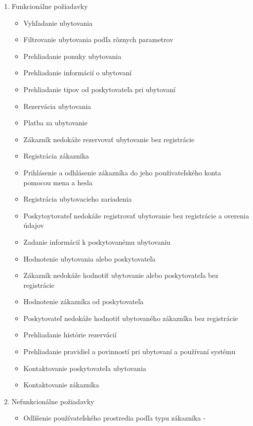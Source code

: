 \begin{enumerate}[label=\Alph*.]
    \item Funkcionálne požiadavky
    \begin{itemize}
        \item Vyhľadanie ubytovania
        \item Filtrovanie ubytovania podľa rôznych parametrov
        \item Prehliadanie ponuky ubytovania
        \item Prehliadanie informácií o ubytovaní
        \item Prehliadanie tipov od poskytovateľa pri ubytovaní
        \item Rezervácia ubytovania
        \item Platba za ubytovanie
        \item Zákazník nedokáže rezervovať ubytovanie bez registrácie
        \item Registrácia zákazníka
        \item Prihlásenie a odhlásenie zákazníka do jeho používateľského konta 
        pomocou mena a hesla
        \item Registrácia ubytovacieho zariadenia
        \item Poskytoytovateľ nedokáže registrovať ubytovanie bez 
        registrácie a overenia údajov
        \item Zadanie informácií k poskytovanému ubytovaniu
        \item Hodnotenie ubytovania alebo poskytovateľa
        \item Zákazník nedokáže hodnotiť ubytovanie alebo poskytovateľa 
        bez registrácie
        \item Hodnotenie zákazníka od poskytovateľa
        \item Poskytovateľ nedokáže hodnotiť ubytovaného zákazníka bez 
        registrácie
        \item Prehliadanie histórie rezervácií
        \item Prehliadanie pravidiel a povinností pri ubytovaní a 
        používaní systému
        \item Kontaktovanie poskytovateľa ubytovania
        \item Kontaktovanie zákazníka
    \end{itemize}
    \item Nefunkcionálne požiadavky
    \begin{itemize}
        \item Odlíšenie používateľského prostredia podľa typu zákazníka - 

\end{itemize}
\end{enumerate}
